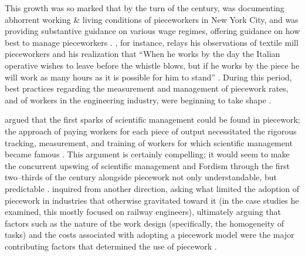 \documentclass[trackingWork]{subfiles}
\begin{document}
This growth was so marked that by the turn of the  century,
\citeauthor{riisOtherSideLives} was documenting abhorrent working \& living conditions of pieceworkers in New York City,
and \citeauthor{norton1900textile} was providing substantive guidance on various wage regimes,
offering guidance on how best to manage pieceworkers
\cite{riisOtherSideLives,norton1900textile}.
\citeauthor{clark1908cotton}, for instance,
relays his observations of textile mill pieceworkers and his realization that
``When he works by the day the Italian operative wishes to leave before the whistle blows,
but if he works by the piece he will work as many hours as it is possible for him to stand''
\cite{clark1908cotton}.
During this period, best practices regarding the measurement and management of
piecework rates, and of workers in the engineering industry,
were beginning to take shape
\cite{burton1899commercial}.


\citeauthor{10.2307/23702539} argued that the first sparks of scientific management
could be found in piecework;
the approach of paying workers for each piece of output necessitated
the rigorous tracking, measurement, and training of workers
for which scientific management became famous
\cite{10.2307/23702539}.
This argument is certainly compelling;
it would seem to make the concurrent upswing of
scientific management and Fordism
through the first two--thirds of the  century
alongside piecework not only understandable, but predictable
\cite{hart2013rise}.
\citeauthor{Brown01041990} inquired from another direction, asking
what limited the adoption of piecework in industries that otherwise gravitated toward it
(in the case studies he examined, this mostly focused on railway engineers),
ultimately arguing that factors such as the nature of the work design
(specifically, the homogeneity of tasks) and the costs associated with adopting a piecework model
were the major contributing factors that determined the use of piecework
\cite{Brown01041990}.
\end{document}
